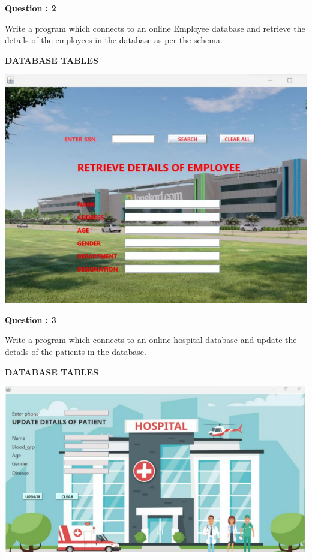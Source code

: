\documentclass[a4paper,12pt]{report}
\begin{document}
\begin{flushleft}
    \textbf{Question : 2}
\end{flushleft}
Write a program which connects to 
an online Employee database and 
retrieve the details of the 
employees in the database as per 
the schema.

\begin{flushleft}
\textbf{DATABASE TABLES}
\end{flushleft}
\includegraphics[scale=0.7]{sports.png}

\begin{flushleft}
	\textbf{Question : 3}
\end{flushleft}
Write a program which connects to an online hospital database and update the details of
the patients in the database.

\begin{flushleft}
	\textbf{DATABASE TABLES}
\end{flushleft}
\includegraphics[scale=0.7]{hospital.png}
\end{document}
